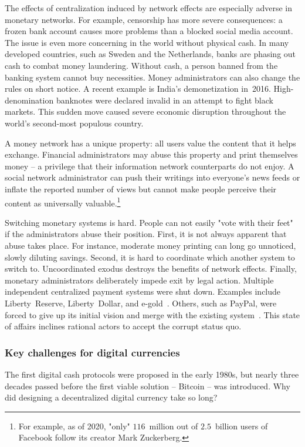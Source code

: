 The effects of centralization induced by network effects are especially adverse in monetary networks.
For example, censorship has more severe consequences: a frozen bank account causes more problems than a blocked social media account.
The issue is even more concerning in the world without physical cash.
In many developed countries, such as Sweden and the Netherlands, banks are phasing out cash to combat money laundering.
Without cash, a person banned from the banking system cannot buy necessities.
Money administrators can also change the rules on short notice.
A recent example is India's demonetization in~2016.
High-denomination banknotes were declared invalid in an attempt to fight black markets.
This sudden move caused severe economic disruption throughout the world's second-most populous country.

A money network has a unique property: all users value the content that it helps exchange.
Financial administrators may abuse this property and print themselves money -- a privilege that their information network counterparts do not enjoy.
A social network administrator can push their writings into everyone's news feeds or inflate the reported number of views but cannot make people perceive their content as universally valuable.\footnote{For example, as of 2020, "only" $116$~million out of $2.5$~billion users of Facebook follow its creator Mark Zuckerberg.}

Switching monetary systems is hard.
People can not easily "vote with their feet" if the administrators abuse their position.
First, it is not always apparent that abuse takes place.
For instance, moderate money printing can long go unnoticed, slowly diluting savings.
Second, it is hard to coordinate which another system to switch to.
Uncoordinated exodus destroys the benefits of network effects.
Finally, monetary administrators deliberately impede exit by legal action.
Multiple independent centralized payment systems were shut down.
Examples include Liberty~Reserve, Liberty~Dollar, and e-gold~\cite{White2014, Trautman2014}.
Others, such as PayPal, were forced to give up its initial vision and merge with the existing system~\cite{Jackson2017}.
This state of affairs inclines rational actors to accept the corrupt status quo.


\subsubsection*{Key challenges for digital currencies}

The first digital cash protocols were proposed in the early 1980s, but nearly three decades passed before the first viable solution -- Bitcoin -- was introduced.
Why did designing a decentralized digital currency take so long?


